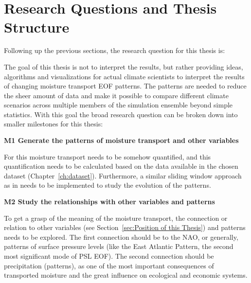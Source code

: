 \section{Research Questions and Thesis Structure}
\label{sec:research_questions}

Following up the previous sections, the research question for this thesis is: 

\begin{center}
\end{center}

The goal of this thesis is not to interpret the results, but rather providing ideas, algorithms and visualizations for actual climate scientists to interpret the results of changing moisture transport EOF patterns. 
The patterns are needed to reduce the sheer amount of data and make it possible to compare different climate scenarios across multiple members of the simulation ensemble beyond simple statistics.
With this goal the broad research question can be broken down into smaller milestones for this thesis: 

\textbf{M1 Generate the patterns of moisture transport and other variables}

For this moisture transport needs to be somehow quantified, and this quantification needs to be calculated based on the data available in the chosen dataset (Chapter~\ref{ch:dataset}). 
Furthermore, a similar sliding window approach as in \cite{vietinghoff_visual_2021} needs to be implemented to study the evolution of the patterns.

\textbf{M2 Study the relationships with other variables and patterns}

To get a grasp of the meaning of the moisture transport, the connection or relation to other variables (see Section~\ref{sec:Position of this Thesis}) and patterns needs to be explored. 
The first connection should be to the NAO, or generally, patterns of surface pressure levels (like the East Atlantic Pattern, the second most significant mode of PSL EOF). 
The second connection should be precipitation (patterns), as one of the most important consequences of transported moisture and the great influence on ecological and economic systems. 



